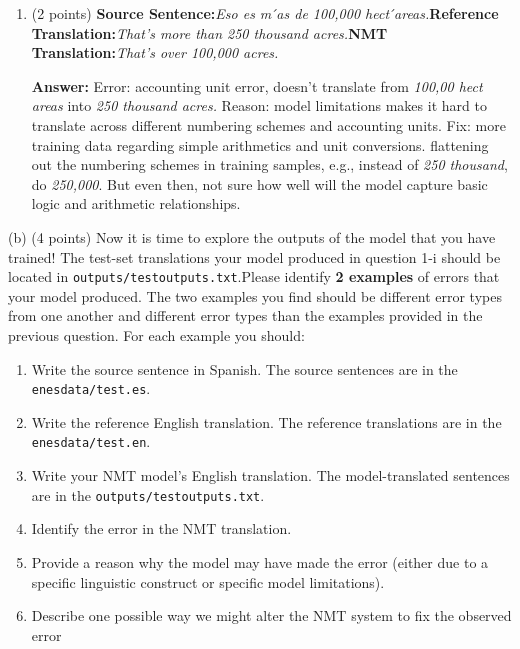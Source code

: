 \documentclass{article}
\begin{document}
\begin{enumerate}[i]
        \item  (2 points) \textbf{Source Sentence:}\textit{Eso es m ́as de 100,000 hect ́areas.}\newline \textbf{Reference Translation:}\textit{That’s more than 250 thousand acres.}\newline \textbf{NMT Translation:}\textit{That’s over 100,000 acres.}
        
        \textbf{Answer:} \newline Error: accounting unit error, doesn't translate from \textit{100,00 hect areas} into \textit{250 thousand acres.} \newline Reason: model limitations makes it hard to translate across different numbering schemes and accounting units. \newline Fix: more training data regarding simple arithmetics and unit conversions.  flattening out the numbering schemes in training samples, e.g., instead of \textit{250 thousand}, do \textit{250,000}. But even then, not sure how well will the model capture basic logic and arithmetic relationships.
    \end{enumerate}
    \bigbreak
    \bigbreak
\noindent
(b)  (4 points)  Now it is time to explore the outputs of the model that you have trained!  The test-set translations your model produced in question 1-i should be located in \verb|outputs/testoutputs.txt|.Please identify \textbf{2 examples} of errors that your model produced. The two examples you find should be different error types from one another and different error types than the examples provided in the previous question.  For each example you should: 
\begin{enumerate}
    \item Write the source sentence in Spanish.  The source sentences are in the \verb|enesdata/test.es|.
    \item Write the reference English translation. The reference translations are in the \verb|enesdata/test.en|.
    \item Write  your  NMT  model’s  English  translation.    The  model-translated  sentences  are  in  the \verb|outputs/testoutputs.txt|.
    \item Identify the error in the NMT translation.
    \item Provide a reason why the model may have made the error (either due to a specific linguistic construct or specific model limitations).
    \item Describe one possible way we might alter the NMT system to fix the observed error
\end{enumerate}
\end{document}
